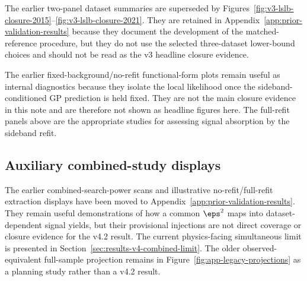 The earlier two-panel dataset summaries are superseded by
Figures~\ref{fig:v3-lslb-closure-2015}--\ref{fig:v3-lslb-closure-2021}. They are retained
in Appendix~\ref{app:prior-validation-results} because they document the development of
the matched-reference procedure, but they do not use the selected three-dataset lower-bound
choices and should not be read as the v3 headline closure evidence.

\FloatBarrier

The earlier fixed-background/no-refit functional-form plots remain useful as internal
diagnostics because they isolate the local likelihood once the sideband-conditioned GP
prediction is held fixed. They are not the main closure evidence in this note and are
therefore not shown as headline figures here. The full-refit panels above are the
appropriate studies for assessing signal absorption by the sideband refit.

\subsection{Auxiliary combined-study displays}

The earlier combined-search-power scans and illustrative no-refit/full-refit extraction
displays have been moved to Appendix~\ref{app:prior-validation-results}. They remain
useful demonstrations of how a common $\eps^2$ maps into dataset-dependent signal
yields, but their provisional injections are not direct coverage or closure evidence
for the v4.2 result. The current physics-facing simultaneous limit is presented
in Section~\ref{sec:results-v4-combined-limit}. The older observed-equivalent
full-sample projection remains in
Figure~\ref{fig:app-legacy-projections} as a planning study rather than a v4.2 result.
